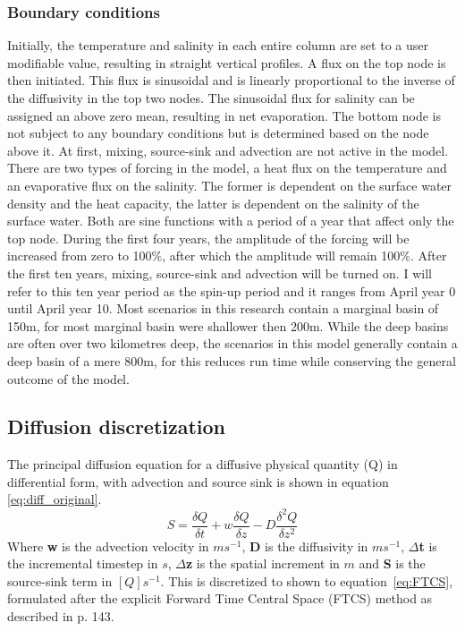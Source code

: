 \documentclass[twocolumn]{article}
\begin{document}
\subsubsection{Boundary conditions}
\label{sect:boundary_conditions}
Initially, the temperature and salinity in each entire column are set to a user modifiable value, resulting in straight vertical profiles. A flux on the top node is then initiated. This flux is sinusoidal and is linearly proportional to the inverse of the diffusivity in the top two nodes. The sinusoidal flux for salinity can be assigned an above zero mean, resulting in net evaporation. The bottom node is not subject to any boundary conditions but is determined based on the node above it. At first, mixing, source-sink and advection are not active in the model.
There are two types of forcing in the model, a heat flux on the temperature and an evaporative flux on the salinity. The former is dependent on the surface water density and the heat capacity, the latter is dependent on the salinity of the surface water. Both are sine functions with a period of a year that affect only the top node.
During the first four years, the amplitude of the forcing will be increased from zero to 100$\%$, after which the amplitude will remain 100$\%$. After the first ten years, mixing, source-sink and advection will be turned on. I will refer to this ten year period as the spin-up period and it ranges from April year 0 until April year 10. Most scenarios in this research contain a marginal basin of 150m, for most marginal basin were shallower then 200m. While the deep basins are often over two kilometres deep, the scenarios in this model generally contain a deep basin of a mere 800m, for this reduces run time while conserving the general outcome of the model. %

\subsection{Diffusion discretization}
The principal diffusion equation for a diffusive physical quantity (Q) in differential form, with advection and source sink is shown in equation \ref{eq:diff_original}.
\begin{equation}
    S = \frac{\delta Q}{\delta t} + w\frac{\delta Q}{\delta z} - D\frac{\delta^2 Q}{\delta z^2}
\label{eq:diff_original}
\end{equation}
Where \textbf{w} is the advection velocity in $m s^{-1}$, \textbf{D} is the diffusivity in $ms^{-1}$, $\Delta$\textbf{t} is the incremental timestep in $s$, $\Delta$\textbf{z} is the spatial increment in $m$ and \textbf{S} is the source-sink term in $[Q]s^{-1}$.  
This is discretized to shown to equation~\ref{eq:FTCS}, formulated after the explicit Forward Time Central Space (FTCS) method as described in \cite{slingerland2011mathematical} p. 143.
\end{document}
